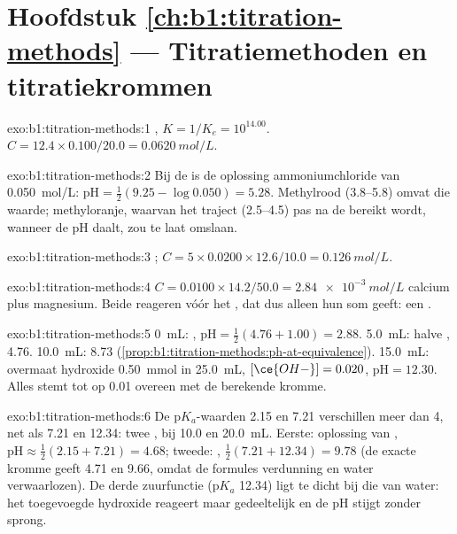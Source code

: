 \section*{Hoofdstuk \ref{ch:b1:titration-methods} --- Titratiemethoden en titratiekrommen}

\begin{solution}{exo:b1:titration-methods:1}
, $K = 1/K_e = 10^{14.00}$. $C = 12.4 \times
0.100/20.0 = \qty{0.0620}{mol/L}$.
\end{solution}


\begin{solution}{exo:b1:titration-methods:2}
Bij de  is de oplossing ammoniumchloride van
\qty{0.050}{mol/L}: $\mathrm{pH} = \frac12(9.25 - \log 0.050) = 5.28$.
Methylrood (3.8--5.8) omvat die waarde; methyloranje, waarvan het traject
(2.5--4.5) pas na de  bereikt wordt, wanneer de pH daalt, zou
te laat omslaan.
\end{solution}

\begin{solution}{exo:b1:titration-methods:3}
;
$C = 5 \times 0.0200 \times 12.6/10.0 = \qty{0.126}{mol/L}$.
\end{solution}

\begin{solution}{exo:b1:titration-methods:4}
$C = 0.0100 \times 14.2/50.0 = \qty{2.84e-3}{mol/L}$ calcium plus
magnesium. Beide reageren vóór het , dat dus alleen hun som
geeft: een .
\end{solution}

\begin{solution}{exo:b1:titration-methods:5}
0~mL: , $\mathrm{pH} = \frac12(4.76 + 1.00) = 2.88$. 5.0~mL:
halve , 4.76. 10.0~mL: 8.73
(\cref{prop:b1:titration-methods:ph-at-equivalence}). 15.0~mL: overmaat
hydroxide \qty{0.50}{mmol} in \qty{25.0}{mL}, $[\ce{OH-}] = 0.020$,
$\mathrm{pH} = 12.30$. Alles stemt tot op 0.01 overeen met de berekende
kromme.
\end{solution}

\begin{solution}{exo:b1:titration-methods:6}
De $\mathrm{p}K_a$-waarden 2.15 en 7.21 verschillen meer dan 4, net als
7.21 en 12.34: twee , bij 10.0 en \qty{20.0}{mL}. Eerste:
oplossing van , $\mathrm{pH} \approx \frac12(2.15 + 7.21) = 4.68$;
tweede: , $\frac12(7.21 + 12.34) = 9.78$ (de exacte kromme
geeft 4.71 en 9.66, omdat de formules verdunning en water verwaarlozen).
De derde zuurfunctie ($\mathrm{p}K_a$ 12.34) ligt te dicht bij die van
water: het toegevoegde hydroxide reageert maar gedeeltelijk en de pH
stijgt zonder sprong.
\end{solution}

